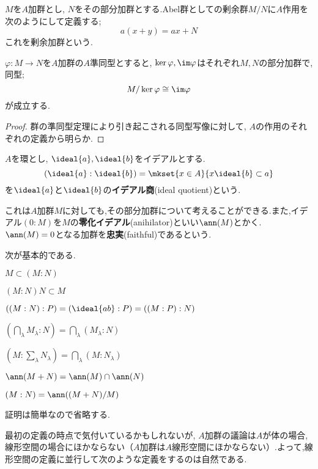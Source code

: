 \begin{defi}[剰余加群]
	$M$を$A$加群とし, $N$をその部分加群とする.Abel群としての剰余群$M/N$に$A$作用を次のようにして定義する;
	\[a(x+y)=ax+N\]
	これを剰余加群という.
\end{defi}

\begin{thm}[準同型定理]
	$\varphi:M\to N$を$A$加群の$A$準同型とすると, $\ker\varphi,\im\varphi$はそれぞれ$M,N$の部分加群で,同型;
	\[M/\ker\varphi\cong\im\varphi\]
	が成立する.
\end{thm}
\begin{proof}
	群の準同型定理により引き起こされる同型写像に対して, $A$の作用のそれぞれの定義から明らか.
\end{proof}

\begin{defi}[イデアル商]
	$A$を環とし, $\ideal{a},\ideal{b}$をイデアルとする.
	\[(\ideal{a}:\ideal{b})=\mkset{x\in A}{x\ideal{b}\subset a}\]
	を$\ideal{a}$と$\ideal{b}$の\textbf{イデアル商}(ideal quotient)という.
\end{defi}

これは$A$加群$M$に対しても,その部分加群について考えることができる.また,イデアル$(0:M)$を$M$の\textbf{零化イデアル}(anihilator)といい$\ann(M)$とかく. $\ann(M)=0$となる加群を\textbf{忠実}(faithful)であるという.

次が基本的である.
\begin{prop}\label{prop:加群商}
	\begin{sakura}
		\item $M\subset(M:N)$
		\item $(M:N)N\subset M$
		\item $((M:N):P)=(\ideal{ab}:P)=((M:P):N)$
		\item $(\bigcap_\lambda M_\lambda:N)=\bigcap_\lambda (M_\lambda:N)$
		\item $(M:\sum_\lambda N_\lambda)=\bigcap_\lambda (M:N_\lambda)$
		\item $\ann (M+N)=\ann (M)\cap\ann (N)$
		\item $(M:N)=\ann((M+N)/M)$
	\end{sakura}
\end{prop}

証明は簡単なので省略する.

最初の定義の時点で気付いているかもしれないが, $A$加群の議論は$A$が体の場合,線形空間の場合にほかならない（$A$加群は$A$線形空間にほかならない）.よって,線形空間の定義に並行して次のような定義をするのは自然である.

